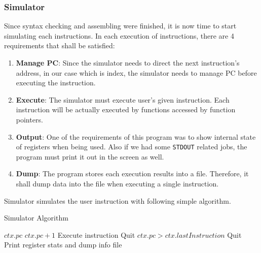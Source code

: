 \documentclass{homework}
\begin{document}
\subsubsection{Simulator}
Since syntax checking and assembling were finished, it is now time to start simulating each instructions. In each execution of instructions, there are 4 requirements that shall be satisfied:
\begin{enumerate}
    \item \textbf{Manage PC}: Since the simulator needs to direct the next instruction's address, in our case which is index, the simulator needs to manage PC before executing the instruction.
    \item \textbf{Execute}: The simulator must execute user's given instruction. Each instruction will be actually executed by functions accessed by function pointers.
    \item \textbf{Output}: One of the requirements of this program was to show internal state of registers when being used. Also if we had some \texttt{STDOUT} related jobs, the program must print it out in the screen as well.
    \item \textbf{Dump}: The program stores each execution results into a file. Therefore, it shall dump data into the file when executing a single instruction.
\end{enumerate}

Simulator simulates the user instruction with following simple algorithm.

\begin{algorithm}
\caption{Simulator Algorithm}\label{alg:cap}
\begin{algorithmic}
        \State $ctx.pc$ \gets $ctx.pc + 1$ 
        \State Execute instruction
            \State Quit
        \EndIf
        \If $ctx.pc > ctx.lastInstruction$ 
            \State Quit
        \EndIf
        \State Print register stats and dump info file
    \EndWhile
\end{algorithmic}
\end{algorithm}
\end{document}
